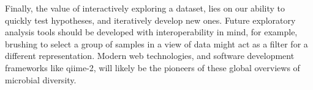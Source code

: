 Finally, the value of interactively exploring a dataset, lies on our ability to
quickly test hypotheses, and iteratively develop new ones. Future exploratory
analysis tools should be developed with interoperability in mind, for example,
brushing to select a group of samples in a view of data might act as a filter
for a different representation. Modern web technologies, and software
development frameworks like \gls{qiime}-2, will likely be the pioneers of these
global overviews of microbial diversity.
